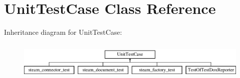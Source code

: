 \hypertarget{class_unit_test_case}{
\section{UnitTestCase Class Reference}
\label{class_unit_test_case}
}
Inheritance diagram for UnitTestCase:\begin{figure}[H]
\begin{center}
\leavevmode
\includegraphics[height=1.854305cm]{class_unit_test_case}
\end{center}
\end{figure}
